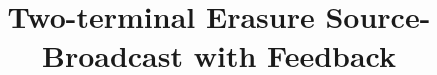 \documentclass[journal,onecolumn,12pt,twoside]{IEEEtranTCOM}
\begin{document}
%
\title{Two-terminal Erasure Source-Broadcast with Feedback}
%
%



\end{document}
